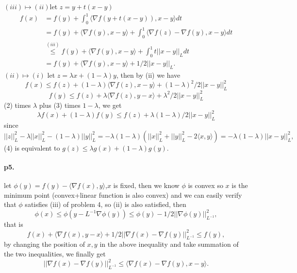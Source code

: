 \documentclass[8pt,a4paper]{article}
\begin{document}
	$(iii)\mapsto (ii)$let $z=y+t(x-y)$
	\begin{equation*}
		\begin{aligned}
			f(x)&=f(y)+\int_0^1 \langle\nabla f(y+t(x-y)),x-y\rangle dt\\
			&=f(y)+\langle\nabla f(y),x-y\rangle+\int_0^1
			\langle\nabla f(z)-\nabla f(y),x-y\rangle dt\\
			&\overset{(iii)}{\leq} f(y)+\langle\nabla f(y),x-y\rangle+\int_0^1
			t||x-y||_L dt\\
			&=f(y)+\langle\nabla f(y),x-y\rangle+1/2
			||x-y||_L.
		\end{aligned}
	\end{equation*}
	$(ii)\mapsto (i)$
	let $z=\lambda x+(1-\lambda)y$, then by (ii)
we have 
\begin{equation}
	f(x)\leq f(z)+(1-\lambda)\langle\nabla f(z),x-y\rangle+(1-\lambda)^2/2||x-y||_L^2
\end{equation}	
\begin{equation}
	f(y)\leq f(z)+\lambda\langle\nabla f(z),y-x\rangle+\lambda^2/2||x-y||_L^2
\end{equation}
	(2) times $\lambda$ plus (3) times $1-\lambda$, we get
	\begin{equation}
		\lambda f(x)+(1-\lambda)f(y)\leq f(z)+\lambda(1-\lambda)/2||x-y||_L^2
	\end{equation}
since \begin{equation*}
	||z||_L^2-\lambda ||x||^2_L-(1-\lambda)||y||_L^2=-\lambda(1-\lambda)\left(||x||_L^2+||y||^2_L-2\langle x,y\rangle\right)=-\lambda(1-\lambda)||x-y||_L^2,
\end{equation*}
(4) is equivalent to $ g(z)\leq \lambda g(x)+(1-\lambda)g(y).$
	
\paragraph{p5. }
let $\phi(y)=f(y)-\langle\nabla f(x),y\rangle$,$x$ is fixed,
then we know $\phi$ is convex so $x$ is the minimum point (convex+linear function is also convex) and we can easily verify that $\phi$  satisfies (iii) of problem 4, so (ii) is also satisfied, then 
\begin{equation*}
	\phi(x)\leq \phi(y-L^{-1}\nabla \phi(y))\leq \phi(y)-1/2||\nabla \phi(y)||^2_{L^{-1}},
\end{equation*} 
that is \begin{equation*}
	f(x)+\langle\nabla f(x),y-x\rangle+1/2||\nabla f(x)-\nabla f(y)||^2_{L^{-1}}\leq f(y),
\end{equation*}
by changing the position of $x,y$ in the above inequality and take summation of the two inequalities, we finally get 
\begin{equation*}
	||\nabla f(x)-\nabla f(y)||^2_{L^{-1}}\leq \langle \nabla f(x)-\nabla f(y),x-y\rangle.
\end{equation*}
	
\end{document}
